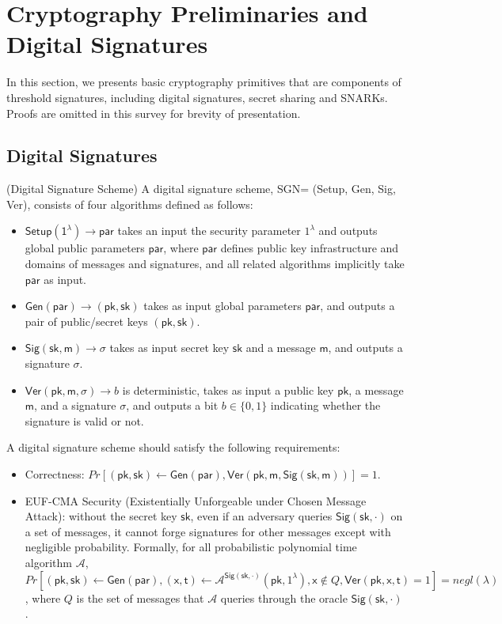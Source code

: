 \section{Cryptography Preliminaries and Digital Signatures} \label{sec:basic}
In this section, we presents basic cryptography primitives that are components of threshold signatures, including digital signatures, secret sharing and SNARKs. Proofs are omitted in this survey for brevity of presentation.  

\subsection{Digital Signatures}

\begin{definition}{(Digital Signature Scheme)} A digital signature scheme, {\sffamily SGN= (Setup, Gen, Sig, Ver)}, consists of four algorithms defined as follows: 
\end{definition}
\begin{itemize}
    \item $\mathsf{Setup(1^\lambda) \to par}$ takes an input the security parameter $1^\lambda$ and outputs global public parameters $\mathsf{par}$, where $\mathsf{par}$ defines public key infrastructure and domains of messages and signatures, and all related algorithms implicitly take $\mathsf{par}$ as input.  
    \item $\mathsf{Gen(par)} \to (\mathsf{pk}, \mathsf{sk})$ takes as input global parameters $\mathsf{par}$, and outputs a pair of public/secret keys $(\mathsf{pk}, \mathsf{sk})$. 
    \item $\mathsf{Sig(sk, m)} \to \sigma$ takes as input secret key $\mathsf{sk}$ and a message $\mathsf{m}$, and outputs a signature $\sigma$. 
    \item $\mathsf{Ver}(\mathsf{pk}, \mathsf{m}, \sigma) \to b $ is deterministic, takes as input a public key $\mathsf{pk}$, a message $\mathsf{m}$, and a signature $\sigma$,  and outputs a bit $b\in\{0,1\}$ indicating whether the signature is valid or not. 
\end{itemize}

A digital signature scheme should satisfy the following requirements:
\begin{itemize}
    \item Correctness: $Pr[(\mathsf{pk}, \mathsf{sk})\leftarrow \mathsf{Gen(par)}, \mathsf{Ver(pk, m, Sig(sk, m))}]=1$. 
    \item EUF-CMA Security (Existentially Unforgeable under Chosen Message Attack): without the secret key $\mathsf{sk}$, even if an adversary queries $\mathsf{Sig(sk, \cdot)}$ on a set of messages, it cannot forge signatures for other messages except with negligible probability. Formally, for all probabilistic polynomial time algorithm $\mathcal{A}$, $Pr[(\mathsf{pk}, \mathsf{sk})\leftarrow \mathsf{Gen(par)}, (\mathsf{x},\mathsf{t})\leftarrow \mathcal{A}^{\mathsf{Sig(sk, \cdot)}}(\mathsf{pk}, 1^\lambda), \mathsf{x}\notin Q, \mathsf{Ver(pk, x, t)}=1] = negl(\lambda)$, where $Q$ is the set of messages that $\mathcal{A}$ queries through the oracle $\mathsf{Sig(sk, \cdot)}$. 
    
\end{itemize}

